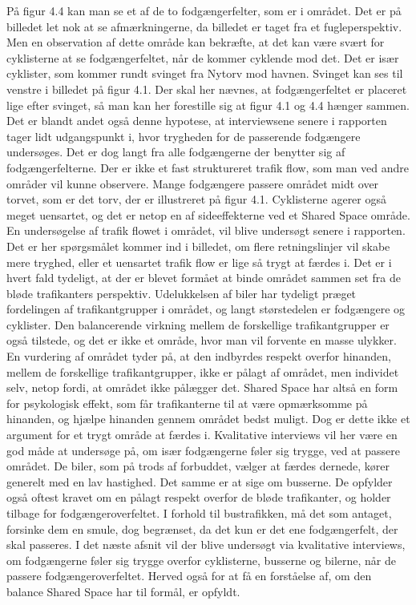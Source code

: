 På figur 4.4 kan man se et af de to fodgængerfelter, som er i området. Det er på billedet let nok at se afmærkningerne, da billedet er taget fra et fugleperspektiv. Men en observation af dette område kan bekræfte, at det kan være svært for cyklisterne at se fodgængerfeltet, når de kommer cyklende mod det. Det er især cyklister, som kommer rundt svinget fra Nytorv mod havnen. Svinget kan ses til venstre i billedet på figur 4.1. Der skal her nævnes, at fodgængerfeltet er placeret lige efter svinget, så man kan her forestille sig at figur 4.1 og 4.4 hænger sammen. Det er blandt andet også denne hypotese, at interviewsene senere i rapporten tager lidt udgangspunkt i, hvor trygheden for de passerende fodgængere undersøges.
Det er dog langt fra alle fodgængerne der benytter sig af fodgængerfelterne. Der er ikke et fast struktureret trafik flow, som man ved andre områder vil kunne observere. Mange fodgængere passere området midt over torvet, som er det torv, der er illustreret på figur 4.1. Cyklisterne agerer også meget uensartet, og det er netop en af sideeffekterne ved et Shared Space område. En undersøgelse af trafik flowet i området, vil blive undersøgt senere i rapporten. Det er her spørgsmålet kommer ind i billedet, om flere retningslinjer vil skabe mere tryghed, eller et uensartet trafik flow er lige så trygt at færdes i. Det er i hvert fald tydeligt, at der er blevet formået at binde området sammen set fra de bløde trafikanters perspektiv. Udelukkelsen af biler har tydeligt præget fordelingen af trafikantgrupper i området, og langt størstedelen er fodgængere og cyklister. Den balancerende virkning mellem de forskellige trafikantgrupper er også tilstede, og det er ikke et område, hvor man vil forvente en masse ulykker. En vurdering af området tyder på, at den indbyrdes respekt overfor hinanden, mellem de forskellige trafikantgrupper, ikke er pålagt af området, men individet selv, netop fordi, at området ikke pålægger det. Shared Space har altså en form for psykologisk effekt, som får trafikanterne til at være opmærksomme på hinanden, og hjælpe hinanden gennem området bedst muligt. Dog er dette ikke et argument for et trygt område at færdes i. Kvalitative interviews vil her være en god måde at undersøge på, om især fodgængerne føler sig trygge, ved at passere området.
De biler, som på trods af forbuddet, vælger at færdes dernede, kører generelt med en lav hastighed. Det samme er at sige om busserne. De opfylder også oftest kravet om en pålagt respekt overfor de bløde trafikanter, og holder tilbage for fodgængeroverfeltet. I forhold til bustrafikken, må det som antaget, forsinke dem en smule, dog begrænset, da det kun er det ene fodgængerfelt, der skal passeres.
I det næste afsnit vil der blive undersøgt via kvalitative interviews, om fodgængerne føler sig trygge overfor cyklisterne, busserne og bilerne, når de passere fodgængeroverfeltet. Herved også for at få en forståelse af, om den balance Shared Space har til formål, er opfyldt.

